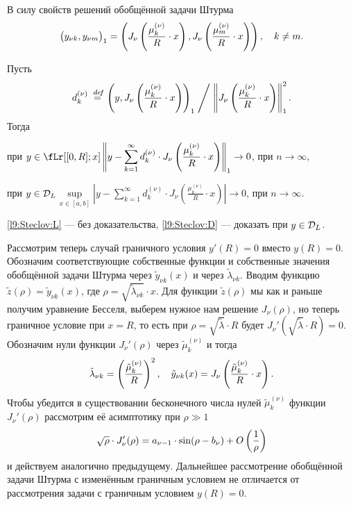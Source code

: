 В силу свойств решений обобщённой задачи Штурма 
\begin{equation*}
	\hfill\big(y_{\nu k},y_{\nu m}\big)_1=\left(J_{\nu}\left(\frac{\mu_{k}^{(\nu)}}{R}\cdot x\right),J_{\nu}\left(\frac{\mu_{m}^{(\nu)}}{R}\cdot x\right)\right),\quad k\neq m.\hfill
\end{equation*}
\begin{_teor}[Стеклова]
	Пусть
	\begin{equation*}
		\hfill d_k^{(\nu)}\eqdef\left(y,J_{\nu}\left(\frac{\mu_{k}^{(\nu)}}{R}\cdot x\right)\right)_1\Biggm/\norm{J_{\nu}\left(\frac{\mu_{k}^{(\nu)}}{R}\cdot x\right)}_1^2.\hfill
	\end{equation*} 
	Тогда 
	\begin{enumerateP1}
		\item\label{l9:Steclov:L}при $y\in\fLr[{[0,R];x}]$\quad $\displaystyle\left\|y-\sum\limits_{k=1}^{\infty}d_k^{(\nu)}\cdot J_{\nu}\left(\frac{\mu_{k}^{(\nu)}}{R}\cdot x\right)\right\|_1\to0$, при $n\to\infty$,
		\item\label{l9:Steclov:D}при $y\in\mathcal{D}_L$\quad$\displaystyle\sup\limits_{x\in[a,b]}\left|y-\sum\limits_{k=1}^{\infty}d_k^{(\nu)}\cdot J_{\nu}\left(\frac{\mu_{k}^{(\nu)}}{R}\cdot x\right)\right|\to0$, при $n\to\infty$. 
	\end{enumerateP1} 
\end{_teor}
\noindent\ref{l9:Steclov:L} --- без доказательства, \ref{l9:Steclov:D} --- доказать при $y\in\mathcal{D}_L$. 

Рассмотрим теперь случай граничного условия $y'(R)=0$ вместо $y(R)=0$. Обозначим соответствующие собственные функции и собственные значения обобщённой задачи Штурма через $\tilde{y}_{\nu k}(x)$ и через $\tilde{\lambda}_{\nu k}$. Вводим функцию $\tilde{z}(\rho)=\tilde{y}_{\nu k}(x)$, где $\rho=\sqrt{\tilde{\lambda}_{\nu k}}\cdot x$. Для функции $\tilde{z}(\rho)$ мы как и раньше получим уравнение Бесселя, выберем нужное нам решение $J_{\nu}(\rho)$, но теперь граничное условие при $x=R$, то есть при $\rho=\sqrt{\tilde{\lambda}}\cdot R$ будет $J_{\nu}'\left(\sqrt{\tilde{\lambda}}\cdot R\right)=0$. Обозначим нули функции $J_{\nu}'(\rho)$ через $\tilde{\mu}_k^{(\nu)}$ и тогда 
\begin{equation*}
	\hfill\tilde{\lambda}_{\nu k}=\left(\frac{\tilde{\mu}_k^{(\nu)}}{R}\right)^2,\quad \tilde{y}_{\nu k}(x)=J_{\nu}\left(\frac{\tilde{\mu}_k^{(\nu)}}{R}\cdot x\right).\hfill
\end{equation*}
Чтобы убедится в существовании бесконечного числа нулей $\tilde{\mu}_k^{(\nu)}$ функции $J_{\nu}'(\rho)$ рассмотрим её асимптотику при $\rho\gg1$
\begin{equation*}
	\hfill\sqrt{\rho}\cdot J_{\nu}'(\rho)=a_{\nu-1}\cdot\sin(\rho-b_{\nu})+O\left(\frac{1}{\rho}\right)\hfill
\end{equation*}
и действуем аналогично предыдущему. Дальнейшее рассмотрение обобщённой задачи Штурма с изменённым граничным условием не отличается от рассмотрения задачи с граничным условием $y(R)=0$.

